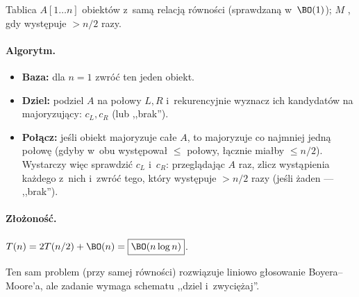 Tablica $A[1\ldots n]$ obiektów z~samą relacją równości (sprawdzaną w~$\BO(1)$);
$M$ , gdy występuje $>n/2$ razy.

\paragraph{Algorytm.}
\begin{itemize}[nosep]
	\item \textbf{Baza:} dla $n=1$ zwróć ten jeden obiekt.
	\item \textbf{Dziel:} podziel $A$ na połowy $L,R$ i~rekurencyjnie wyznacz ich
	      kandydatów na majoryzujący: $c_L,c_R$ (lub ,,brak'').
	\item \textbf{Połącz:} jeśli obiekt majoryzuje całe $A$, to majoryzuje co
	      najmniej jedną połowę (gdyby w~obu występował $\leq$ połowy, łącznie
	      miałby $\leq n/2$). Wystarczy więc sprawdzić $c_L$ i~$c_R$: przeglądając
	      $A$ raz, zlicz wystąpienia każdego z~nich i~zwróć tego, który występuje
	      $>n/2$ razy (jeśli żaden --- ,,brak'').
\end{itemize}

\paragraph{Złożoność.}
$T(n)=2T(n/2)+\BO(n)=\boxed{\BO(n\log n)}$.
\begin{remark}
	Ten sam problem (przy samej równości) rozwiązuje liniowo głosowanie
	Boyera--Moore'a, ale zadanie wymaga schematu ,,dziel i~zwyciężaj''.
\end{remark}
